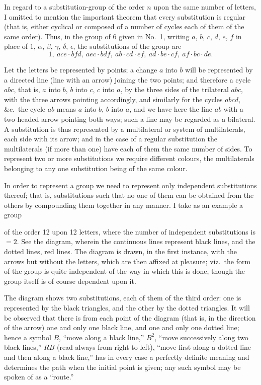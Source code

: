 \documentclass[11pt,a4paper]{article}
\begin{document}
\medskip

In regard to a substitution-group of the order $n$ upon the same number of letters, I omitted to mention the important theorem that every substitution is regular (that is, either cyclical or composed of a number of cycles each of them of the same order). Thus, in the group of 6 given in No.\ 1, writing $a$, $b$, $c$, $d$, $e$, $f$ in place of $1$, $\alpha$, $\beta$, $\gamma$, $\delta$, $\epsilon$, the substitutions of the group are
\[
1, \ ace \cdot bfd, \ aec \cdot bdf, \ ab \cdot cd \cdot ef, \ ad \cdot be \cdot cf, \ af \cdot bc \cdot de.
\]

Let the letters be represented by points; a change $a$ into $b$ will be represented by a directed line (line with an arrow) joining the two points; and therefore a cycle $abc$, that is, $a$ into $b$, $b$ into $c$, $c$ into $a$, by the three sides of the trilateral $abc$, with the three arrows pointing accordingly, and similarly for the cycles $abcd$, \&c.\ the cycle $ab$ means $a$ into $b$, $b$ into $a$, and we have here the line $ab$ with a two-headed arrow pointing both ways; such a line may be regarded as a bilateral. A substitution is thus represented by a multilateral or system of multilaterals, each side with its arrow; and in the case of a regular substitution the multilaterals (if more than one) have each of them the same number of sides. To represent two or more substitutions we require different colours, the multilaterals belonging to any one substitution being of the same colour.

In order to represent a group we need to represent only independent substitutions thereof; that is, substitutions such that no one of them can be obtained from the others by compounding them together in any manner. I take as an example a group

\clearpage
of the order 12 upon 12 letters, where the number of independent substitutions is $= 2$. See the diagram, wherein the continuous lines represent black lines, and the dotted lines, red lines. The diagram is drawn, in the first instance, with the arrows but without the letters, which are then affixed at pleasure; viz.\ the form of the group is quite independent of the way in which this is done, though the group itself is of course dependent upon it.

The diagram shows two substitutions, each of them of the third order: one is represented by the black triangles, and the other by the dotted triangles. It will be observed that there is from each point of the diagram (that is, in the direction of the arrow) one and only one black line, and one and only one dotted line; hence a symbol $B$, ``move along a black line,'' $B^2$, ``move successively along two black lines,'' $RB$ (read always from right to left), ``move first along a dotted line and then along a black line,'' has in every case a perfectly definite meaning and determines the path when the initial point is given; any such symbol may be spoken of as a ``route.''
\end{document}
